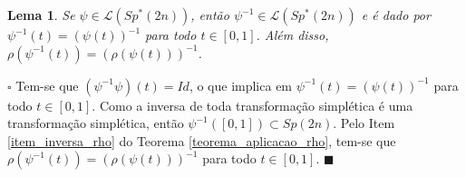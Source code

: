 \documentclass[12pt]{book}
\newtheorem{lema}[teorema]{Lema}
\newenvironment{prova}[1]{$\square$ #1}{\hfill$\blacksquare$}
\newcommand{\caminhos}{\mathcal{L}}
\newcommand{\gruposimpletico}[1]{Sp(#1)}
\newcommand{\gruposimpleticonaodegenerado}[1]{Sp^{#1}(2n)}
\newcommand{\intervalo}{[0,1]}
\begin{document}
	\begin{lema}\label{lema_inversa_caminho_especial}
		Se $\psi \in   \caminhos({\gruposimpleticonaodegenerado{*}}) $, então $\psi^{-1} \in   \caminhos({\gruposimpleticonaodegenerado{*}})$ e é dado por $\psi^{-1}(t)=(\psi(t))^{-1}$ para todo $t\in \intervalo$. Além disso, $\rho(\psi^{-1}(t)) = (\rho(\psi(t)))^{-1}$.
	\end{lema}
	\begin{prova}
		Tem-se que $(\psi^{-1}\psi)(t)=Id$, o que implica em $\psi^{-1}(t)=(\psi(t))^{-1}$ para todo $t\in \intervalo$. Como a inversa de toda transformação simplética é uma transformação simplética, então $\psi^{-1}(\intervalo) \subset \gruposimpletico{2n}$. Pelo Item \ref{item_inversa_rho} do Teorema \ref{teorema_aplicacao_rho}, tem-se que $\rho(\psi^{-1}(t))= (\rho(\psi(t)))^{-1}$ para todo $t\in \intervalo$.
	\end{prova}
	
\end{document}
